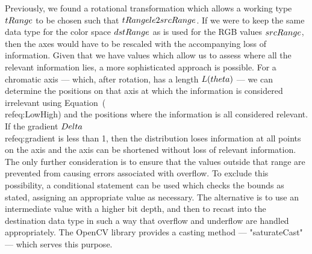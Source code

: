 Previously, we found a rotational transformation which allows a working type $\\tRange$ to be chosen such that $\\tRange \\le 2 \\srcRange$. If we were to keep the same data type for the color space $\\dstRange$ as is used for the RGB values $\\srcRange$, then the axes would have to be rescaled with the accompanying loss of information. Given that we have values which allow us to assess where all the relevant information lies, a more sophisticated approach is possible. For a chromatic axis --- which, after rotation, has a length $L(\\theta)$ --- we can determine the positions on that axis at which the information is considered irrelevant using Equation~(\\ref{eq:LowHigh}) and the positions where the information is all considered relevant. If the gradient $ \\Delta$ \\ref{eq:gradient} is less than 1, then the distribution loses information at all points on the axis and the axis can be shortened without loss of relevant information. The only further consideration is to ensure that the values outside that range are prevented from causing errors associated with overflow. To exclude this possibility, a conditional statement can be used which checks the bounds as stated, assigning an appropriate value as necessary. The alternative is to use an intermediate value with a higher bit depth, and then to recast into the destination data type in such a way that overflow and underflow are handled appropriately. The OpenCV library provides a casting method --- "saturateCast" --- which serves this purpose.

